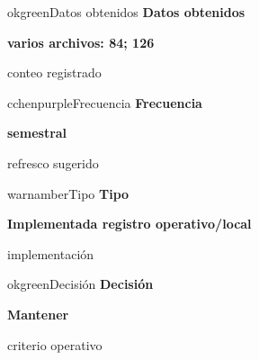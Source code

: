\documentclass[9pt,a4paper]{extarticle}
\begin{document}
\vspace{0.04cm}
\begin{minipage}{0.24\textwidth}
\begin{metricbox}{okgreen}{Datos obtenidos}
{\large\bfseries Datos obtenidos}\par
{\Large\bfseries varios archivos: 84; 126}\par
{\normalsize conteo registrado}
\end{metricbox}
\end{minipage}\hfill
\begin{minipage}{0.24\textwidth}
\begin{metricbox}{cchenpurple}{Frecuencia}
{\large\bfseries Frecuencia}\par
{\large\bfseries semestral}\par
{\normalsize refresco sugerido}
\end{metricbox}
\end{minipage}\hfill
\begin{minipage}{0.24\textwidth}
\begin{metricbox}{warnamber}{Tipo}
{\large\bfseries Tipo}\par
{\normalsize\bfseries Implementada registro operativo/local}\par
{\normalsize implementación}
\end{metricbox}
\end{minipage}\hfill
\begin{minipage}{0.24\textwidth}
\begin{metricbox}{okgreen}{Decisión}
{\large\bfseries Decisión}\par
{\normalsize\bfseries Mantener}\par
{\normalsize criterio operativo}
\end{metricbox}
\end{minipage}
\end{document}
